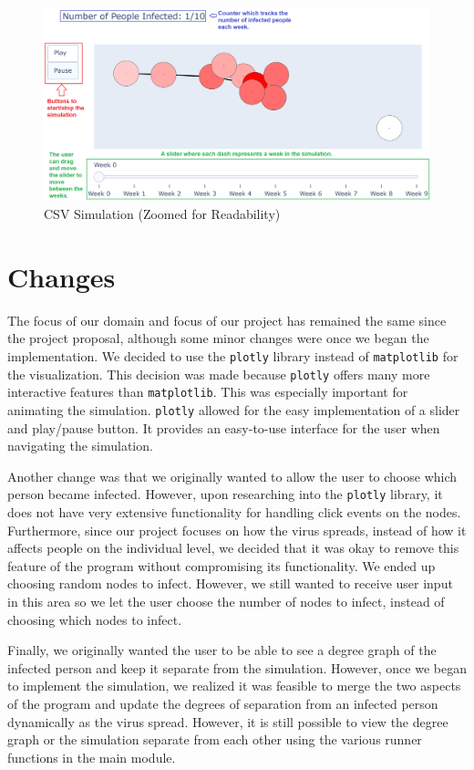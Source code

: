 \documentclass[fontsize=11pt]{article}
\begin{document}
\begin{figure}[h]
    \centering
    \includegraphics[width=170mm,scale=0.3]{pictures/run_csv_simulation.png}
    \caption{CSV Simulation (Zoomed for Readability)}
\end{figure}
\newpage
\section*{Changes}
The focus of our domain and focus of our project has remained the same since the project proposal, although some minor changes were once we began the implementation. We decided to use the \texttt{plotly} library instead of \texttt{matplotlib} for the visualization. This decision was made because \texttt{plotly} offers many more interactive features than \texttt{matplotlib}. This was especially important for animating the simulation. \texttt{plotly} allowed for the easy implementation of a slider and play/pause button. It provides an easy-to-use interface for the user when navigating the simulation.

Another change was that we originally wanted to allow the user to choose which person became infected. However, upon researching into the \texttt{plotly} library, it  does not have very extensive functionality for handling click events on the nodes. Furthermore, since our project focuses on how the virus spreads, instead of how it affects people on the individual level, we decided that it was okay to remove this feature of the program without compromising its functionality. We ended up choosing random nodes to infect. However, we still wanted to receive user input in this area so we let the user choose the number of nodes to infect, instead of choosing which nodes to infect.

Finally, we originally wanted the user to be able to see a degree graph of the infected person and keep it separate from the simulation. However, once we began to implement the simulation, we realized it was feasible to merge the two aspects of the program and update the degrees of separation from an infected person dynamically as the virus spread. However, it is still possible to view the degree graph or the simulation separate from each other using the various runner functions in the main module.
\end{document}
